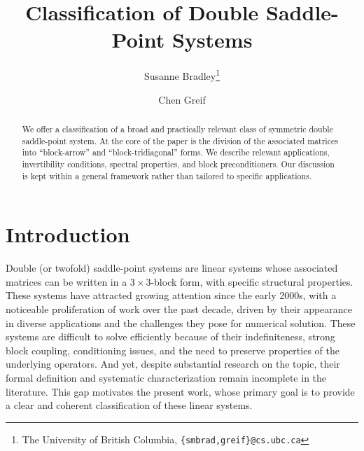 \documentclass{article}
\title{Classification of Double Saddle-Point Systems}
\author{Susanne Bradley\thanks{The University of British Columbia, 
  \texttt{\{smbrad,greif\}@cs.ubc.ca}} \and Chen Greif\footnotemark[2]}
\begin{document}
\maketitle

\begin{abstract}
We offer a classification of a broad and practically relevant class of symmetric double saddle-point system. At the core of the paper is the division  of the associated matrices into ``block-arrow'' and ``block-tridiagonal'' forms. We describe relevant applications, invertibility conditions, spectral properties, and  block preconditioners. Our discussion is kept within a general framework rather than tailored to specific applications.
\end{abstract}



\section{Introduction}
\label{sec:intro}
Double (or twofold) saddle-point systems are linear systems whose associated matrices can be written in a $3 \times 3$-block form, with specific structural properties. These systems have attracted growing attention since the early 2000s, with a noticeable proliferation of work over the past decade, driven by their appearance in diverse applications and the challenges they pose for numerical solution. These systems are difficult to solve efficiently because of their indefiniteness, strong block coupling, conditioning issues, and the need to preserve properties of the underlying operators. And yet, despite substantial research on the topic, their formal definition and systematic characterization remain incomplete in the literature. This gap motivates the present work, whose primary goal is to provide a clear and coherent classification of these linear systems.
\end{document}
